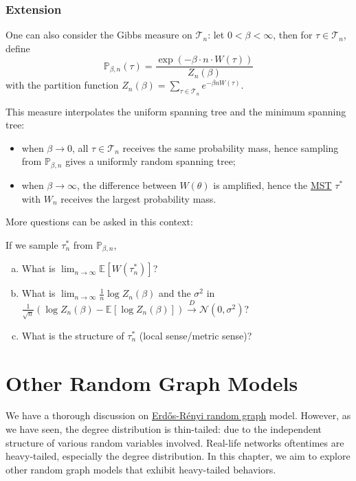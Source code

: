 \subsection{Extension}
One can also consider the Gibbs measure on \(\mathcal{T} _n\): let \(0 < \beta < \infty \), then for \(\tau \in \mathcal{T} _n\), define
\[
	\mathbb{P} _{\beta , n}(\tau )
	= \frac{\exp (-\beta \cdot n \cdot W(\tau ))}{Z_n(\beta )}
\]
with the partition function \(Z_n(\beta ) = \sum_{\tau \in \mathcal{T} _n} e^{-\beta n W(\tau )}\).

\begin{intuition}
	This measure interpolates the uniform spanning tree and the minimum spanning tree:
	\begin{itemize}
		\item when \(\beta \to 0\), all \(\tau \in \mathcal{T} _n\) receives the same probability mass, hence sampling from \(\mathbb{P} _{\beta , n}\) gives a uniformly random spanning tree;
		\item when \(\beta \to \infty \), the difference between \(W(\theta )\) is amplified, hence the \hyperref[prb:MST]{MST} \(\tau ^{\ast} \) with \(W_n\) receives the largest probability mass.
	\end{itemize}
\end{intuition}

More questions can be asked in this context:

\begin{problem*}
	If we sample \(\tau _n^{\ast} \) from \(\mathbb{P} _{\beta , n}\),
	\begin{enumerate}[(a)]
		\item What is \(\lim_{n \to \infty} \mathbb{E}_{}[W(\tau _n^{\ast} )] \)?
		\item What is \(\lim_{n \to \infty} \frac{1}{n} \log Z_n(\beta )\) and the \(\sigma ^2\) in \(\frac{1}{\sqrt{n} } (\log Z_n(\beta ) - \mathbb{E}_{}[\log Z_n(\beta )] ) \overset{D}{\to} \mathcal{N} (0, \sigma ^2)\)?
		\item What is the structure of \(\tau _n^{\ast} \) (local sense/metric sense)?
	\end{enumerate}
\end{problem*}

\chapter{Other Random Graph Models}
We have a thorough discussion on \hyperref[def:Erdős-Rényi-random-graph]{Erdős-Rényi random graph} model. However, as we have seen, the degree distribution is thin-tailed: due to the independent structure of various random variables involved. Real-life networks oftentimes are heavy-tailed, especially the degree distribution. In this chapter, we aim to explore other random graph models that exhibit heavy-tailed behaviors.

